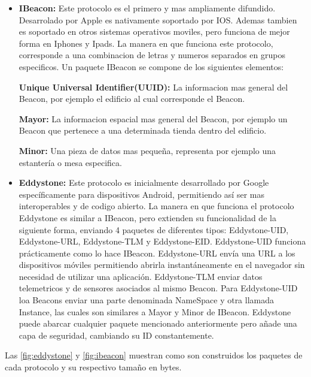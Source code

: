 \begin{itemize}
\item \textbf{IBeacon: } Este protocolo es el primero y mas ampliamente difundido. Desarrolado por Apple es nativamente soportado por IOS. Ademas tambien es soportado en otros sistemas operativos moviles, pero funciona de mejor forma en Iphones y Ipads. La manera en que funciona este protocolo, corresponde a una combinacion de letras y numeros separados en grupos especificos. Un paquete IBeacon se compone de los siguientes elementos:

\textbf{Unique Universal Identifier(UUID): } La informacion mas general del Beacon, por ejemplo el edificio al cual corresponde el Beacon.

\textbf{Mayor: } La informacion espacial mas general del Beacon, por ejemplo un Beacon que pertenece a una determinada tienda dentro del edificio.

\textbf{Minor: } Una pieza de datos mas pequeña, representa por ejemplo una estantería o mesa especifica.

\item \textbf{Eddystone: } Este protocolo es inicialmente desarrollado por Google específicamente para dispositivos Android, permitiendo así ser mas interoperables y de codigo abierto. La manera en que funciona el protocolo Eddystone es similar a IBeacon, pero extienden su funcionalidad de la siguiente forma, enviando 4 paquetes de diferentes tipos: Eddystone-UID, Eddystone-URL, Eddystone-TLM y Eddystone-EID. Eddystone-UID funciona prácticamente como lo hace IBeacon. Eddystone-URL envía una URL a los dispositivos móviles permitiendo abrirla instantáneamente en el navegador sin necesidad de utilizar una aplicación. Eddystone-TLM enviar datos telemetricos y de sensores asociados al mismo Beacon. Para Eddystone-UID loa Beacons enviar una parte denominada NameSpace y otra llamada Instance, las cuales son similares a Mayor y Minor de IBeacon. Eddystone puede abarcar cualquier paquete mencionado anteriormente pero añade una capa de seguridad, cambiando su ID constantemente.

\end{itemize}

Las \autoref{fig:eddystone} y \autoref{fig:ibeacon} muestran como son construidos los paquetes de cada protocolo y su respectivo tamaño en bytes.

